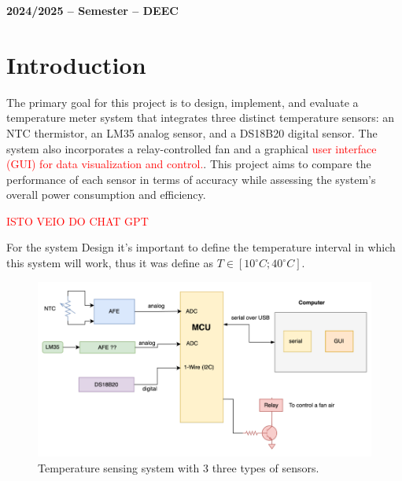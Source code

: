 \documentclass[12pt]{article}
\begin{document}

\vspace{6cm}

\begin{center}
    \large \bf 2024/2025 --  Semester -- DEEC
\end{center}

\thispagestyle{empty}

\setcounter{page}{0}

\newpage

\newpage

\tableofcontents %

\newpage

\listoffigures

\newpage

\section{Introduction}


    The primary goal for this project is to design, implement, and evaluate a temperature meter system that integrates three distinct temperature sensors: an NTC thermistor, an LM35 analog sensor, and a DS18B20 digital sensor. The system also incorporates a relay-controlled fan and a graphical \textcolor{red}{ user interface (GUI) for data visualization and control.}. This project aims to compare the performance of each sensor in terms of accuracy while assessing the system's overall power consumption and efficiency.

    \textcolor{red}{ISTO VEIO DO CHAT GPT}

    \label{requirements}
    For the system Design it's important to define the temperature interval in which this system will work, thus it was define as $ T \in [10^\circ C; 40^\circ C]$. 

   \begin{figure}[H] 
        \centering
        \includegraphics*[scale = 0.5]{images/system-design.png}
        \caption{Temperature sensing system with 3 three types of sensors.}
        \label{wrap-fig:1}
    \end{figure}
\end{document}
